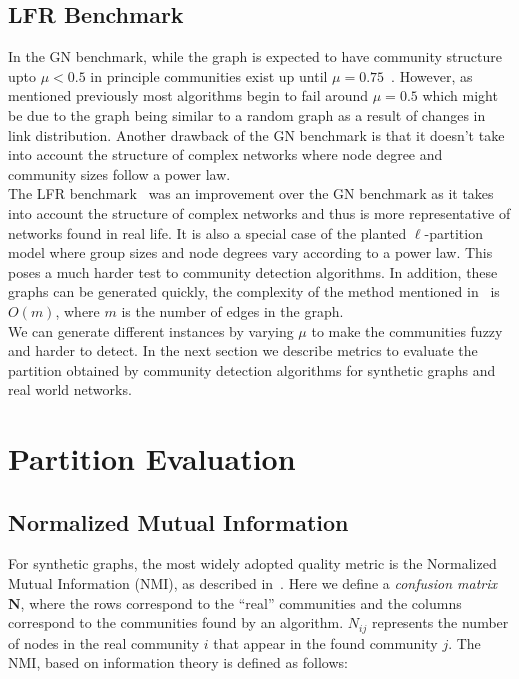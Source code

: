 \begin{spacing}{1.5}
\subsection{LFR Benchmark}

In the GN benchmark, while the graph is expected to have community structure upto $\mu < 0.5$ in principle communities exist up until $\mu = 0.75$~\cite{PhysRevE.78.046110}. However, as mentioned previously most algorithms begin to fail around $\mu = 0.5$ which might be due to the graph being similar to a random graph as a result of changes in link distribution. Another drawback of the GN benchmark is that it doesn't take into account the structure of complex networks where node degree and community sizes follow a power law.\\
\indent The LFR benchmark~\cite{PhysRevE.78.046110} was an improvement over the GN benchmark as it takes into account the structure of complex networks and thus is more representative of networks found in real life. It is also a special case of the planted $\ell$-partition model where group sizes and node degrees vary according to a power law. This poses a much harder test to community detection algorithms. In addition, these graphs can be generated quickly, the complexity of the method mentioned in~\cite{PhysRevE.78.046110} is $O(m)$, where $m$ is the number of edges in the graph.\\
\indent We can generate different instances by varying $\mu$ to make the communities fuzzy and harder to detect. In the next section we describe metrics to evaluate the partition obtained by community detection algorithms for synthetic graphs and real world networks.

\section{Partition Evaluation}

\subsection{Normalized Mutual Information}

For synthetic graphs, the most widely adopted quality metric is the Normalized Mutual Information (NMI), as described in~\cite{Danon05comparingcommunity}. Here we define a \emph{confusion matrix} $\mathbf{N}$, where the rows correspond to the ``real'' communities and the columns correspond to the communities found by an algorithm. $N_{ij}$ represents the number of nodes in the real community $i$ that appear in the found community $j$. The NMI, based on information theory is defined as follows:


\end{spacing}
